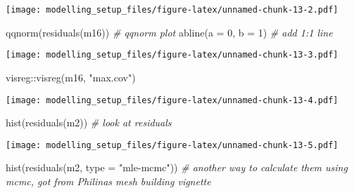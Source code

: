 \documentclass[
]{article}
\newenvironment{Shaded}{\begin{snugshade}}{\end{snugshade}}
\newcommand{\AttributeTok}[1]{\textcolor[rgb]{0.77,0.63,0.00}{#1}}
\newcommand{\CommentTok}[1]{\textcolor[rgb]{0.56,0.35,0.01}{\textit{#1}}}
\newcommand{\DecValTok}[1]{\textcolor[rgb]{0.00,0.00,0.81}{#1}}
\newcommand{\FunctionTok}[1]{\textcolor[rgb]{0.00,0.00,0.00}{#1}}
\newcommand{\NormalTok}[1]{#1}
\newcommand{\SpecialCharTok}[1]{\textcolor[rgb]{0.00,0.00,0.00}{#1}}
\newcommand{\StringTok}[1]{\textcolor[rgb]{0.31,0.60,0.02}{#1}}
\begin{document}
\texttt{[image: modelling\_setup\_files/figure-latex/unnamed-chunk-13-2.pdf]}

\begin{Shaded}
\begin{Highlighting}[]
\FunctionTok{qqnorm}\NormalTok{(}\FunctionTok{residuals}\NormalTok{(m16)) }\CommentTok{\# qqnorm plot}
\FunctionTok{abline}\NormalTok{(}\AttributeTok{a =} \DecValTok{0}\NormalTok{, }\AttributeTok{b =} \DecValTok{1}\NormalTok{) }\CommentTok{\# add 1:1 line}
\end{Highlighting}
\end{Shaded}

\texttt{[image: modelling\_setup\_files/figure-latex/unnamed-chunk-13-3.pdf]}

\begin{Shaded}
\begin{Highlighting}[]
\NormalTok{visreg}\SpecialCharTok{::}\FunctionTok{visreg}\NormalTok{(m16, }\StringTok{"max.cov"}\NormalTok{)}
\end{Highlighting}
\end{Shaded}

\texttt{[image: modelling\_setup\_files/figure-latex/unnamed-chunk-13-4.pdf]}

\begin{Shaded}
\begin{Highlighting}[]
\FunctionTok{hist}\NormalTok{(}\FunctionTok{residuals}\NormalTok{(m2)) }\CommentTok{\# look  at residuals}
\end{Highlighting}
\end{Shaded}

\texttt{[image: modelling\_setup\_files/figure-latex/unnamed-chunk-13-5.pdf]}

\begin{Shaded}
\begin{Highlighting}[]
\FunctionTok{hist}\NormalTok{(}\FunctionTok{residuals}\NormalTok{(m2, }\AttributeTok{type =} \StringTok{"mle{-}mcmc"}\NormalTok{)) }\CommentTok{\# another way to calculate them using mcmc, got from Philina\textquotesingle{}s mesh building vignette}
\end{Highlighting}
\end{Shaded}
\end{document}
